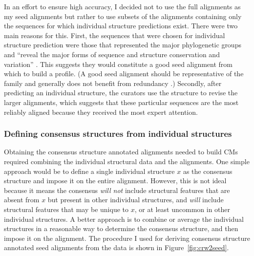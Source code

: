 In an effort to ensure high accuracy, I decided not to
use the full  alignments as my seed alignments but rather to use
subsets of the alignments containing only the sequences for which
individual structure predictions exist.  There were two main reasons
for this. First, the sequences that were chosen for individual
structure prediction were those that represented the major
phylogenetic groups and ``reveal the major forms of sequence and
structure conservation and variation'' \cite{CannoneGutell02}. This
suggests they would constitute a good seed alignment from which to
build a profile. (A good seed alignment should be representative of
the family and generally does not benefit from redundancy
\cite{Durbin98}.) Secondly, after predicting an individual structure,
the  curators use the structure to revise the larger alignments,
which suggests that these particular sequences are the most reliably
aligned because they received the most expert attention.

\subsubsection{Defining consensus structures from individual structures}

Obtaining the consensus structure annotated alignments needed to build
CMs required combining the individual structural data and the
alignments. One simple approach would be to define a single individual
structure $x$ as the consensus structure and impose it on the entire
alignment. However, this is not ideal because it means the consensus
\emph{will not} include structural features that are absent from $x$
but present in other individual structures, and \emph{will} include
structural features that may be unique to $x$, or at least uncommon in
other individual structures. A better approach is to combine or
average the individual structures in a reasonable way to determine the
consensus structure, and then impose it on the alignment. The
procedure I used for deriving consensus structure annotated seed
alignments from the  data is shown in Figure~\ref{fig:crw2seed}.

